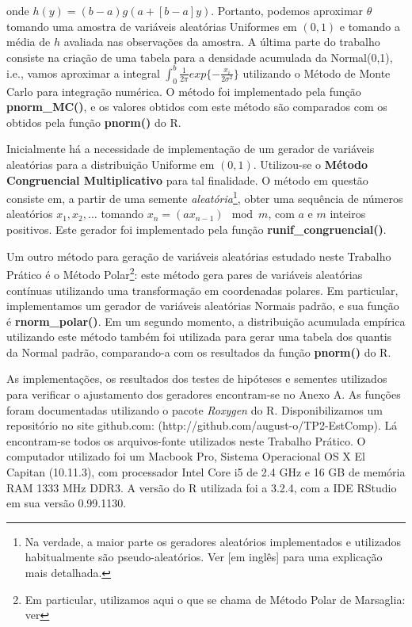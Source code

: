 \documentclass[
	article,			%
	12pt,				%
	twoside,			%
	a4paper,			%
	english,			%
	brazil,				%
	]{abntex2}
\begin{document}
    onde $h(y) = (b-a)g(a+[b-a]y)$. Portanto, podemos aproximar $\theta$ tomando uma amostra de variáveis aleatórias Uniformes em $(0,1)$ e tomando a média de $h$ avaliada nas observações da amostra. A última parte do trabalho consiste na criação de uma tabela para a densidade acumulada da Normal(0,1), i.e., vamos aproximar a integral $\int_0^b \frac{1}{2\pi}exp\{-\frac{x_i}{2\sigma^2}\}$ utilizando o Método de Monte Carlo para integração numérica. O método foi implementado pela função \textbf{pnorm\_MC()}, e os valores obtidos com este método são comparados com os obtidos pela função \textbf{pnorm()} do R.
    
    Inicialmente há a necessidade de implementação de um gerador de variáveis aleatórias para a distribuição Uniforme em $(0,1)$. Utilizou-se o \textbf{Método Congruencial Multiplicativo} para tal finalidade. O método em questão consiste em, a partir de uma semente \textit{aleatória}\footnote{Na verdade, a maior parte os geradores aleatórios implementados e utilizados habitualmente são pseudo-aleatórios. Ver \cite{wiki:001} [em inglês] para uma explicação mais detalhada.}, obter uma sequência de números aleatórios ${x_1,x_2,\dots}$ tomando $x_n = (ax_{n-1}) \mod m$, com $a$ e $m$ inteiros positivos. Este gerador foi implementado pela função \textbf{runif\_congruencial()}. 
    
    Um outro método para geração de variáveis aleatórias estudado neste Trabalho Prático é o Método Polar\footnote{Em particular, utilizamos aqui o que se chama de Método Polar de Marsaglia: ver }: este método gera pares de variáveis aleatórias contínuas utilizando uma transformação em coordenadas polares. Em particular, implementamos um gerador de variáveis aleatórias Normais padrão, e sua função é \textbf{rnorm\_polar()}. Em um segundo momento, a distribuição acumulada empírica utilizando este método também foi utilizada para gerar uma tabela dos quantis da Normal padrão, comparando-a com os resultados da função \textbf{pnorm()} do R.
    
    As implementações, os resultados dos testes de hipóteses e sementes utilizados para verificar o ajustamento dos geradores encontram-se no Anexo A. As funções foram documentadas utilizando o pacote \textit{Roxygen} do R. Disponibilizamos um repositório no site github.com: (http://github.com/august-o/TP2-EstComp). Lá encontram-se todos os arquivos-fonte utilizados neste Trabalho Prático. O computador utilizado foi um Macbook Pro, Sistema Operacional OS X El Capitan (10.11.3), com processador Intel Core i5 de 2.4 GHz e 16 GB de memória RAM 1333 MHz DDR3. A versão do R utilizada foi a 3.2.4, com a IDE RStudio em sua versão 0.99.1130.  
    
\end{document}
